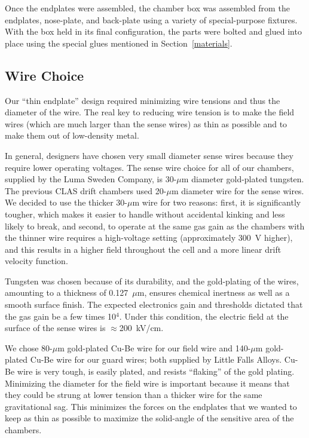 Once the endplates were assembled, the chamber box was assembled from the
endplates, nose-plate, and back-plate using a variety of special-purpose
fixtures.  With the box held in its final configuration, the parts were bolted
and glued into place using the special glues mentioned in Section~\ref{materials}.

\subsection{Wire Choice}

Our ``thin endplate'' design required minimizing wire tensions and
thus the diameter of the wire.  The real key to reducing wire tension is to
make the field wires (which are much larger than the sense wires) as 
thin as possible and to make them out of low-density metal.  

In general, designers have chosen very small diameter sense wires because they
require lower operating voltages.
The sense wire choice for all of our chambers, supplied by the Luma
Sweden Company, is 30-$\mu$m diameter gold-plated tungsten.  
The previous CLAS drift chambers used 20-$\mu$m diameter wire for the
sense wires.  We decided to use the thicker 30-$\mu$m wire for two 
reasons: first, it is significantly tougher, which makes it easier to handle without
accidental kinking and less likely to break, and second, to operate at the same 
gas gain as the chambers with the thinner wire requires a high-voltage setting 
(approximately 300~V higher), and this results in a higher field throughout the cell
and a more linear drift velocity function.  

Tungsten was chosen because of its durability, 
and the gold-plating of the wires, amounting to a thickness of 0.127~$\mu$m, 
ensures chemical inertness as well as a smooth surface finish.  The expected 
electronics gain and thresholds dictated that the gas gain be a few times 
10$^4$.  Under this condition, the electric field at the surface of the sense 
wires is $\approx$200~kV/cm.  

We chose 80-$\mu$m gold-plated Cu-Be wire for our field wire and
140-$\mu$m gold-plated Cu-Be wire for our guard wires; both supplied
by Little Falls Alloys. Cu-Be wire is very tough, is easily plated, and resists
``flaking'' of the gold plating. 
Minimizing the diameter for the field wire is important because it means that they 
could be strung at lower tension than a thicker wire for the same gravitational sag.  
This minimizes the forces on the endplates that we wanted to keep as 
thin as possible to maximize the solid-angle of the sensitive area of
the chambers.


